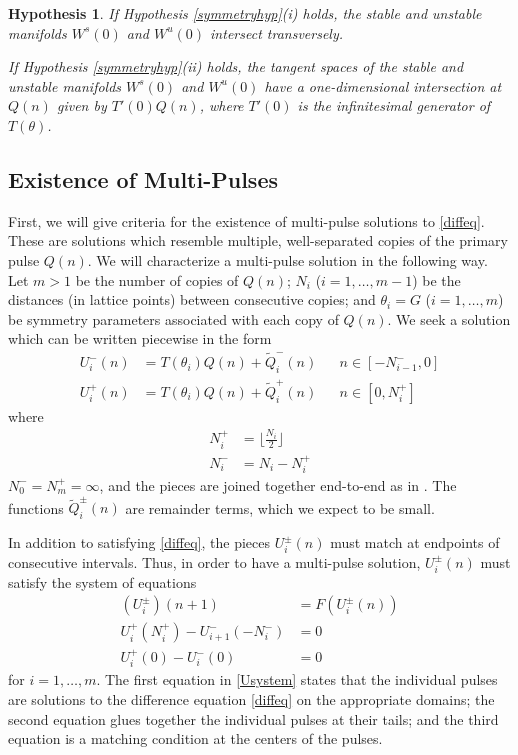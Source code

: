 \documentclass[12pt]{article}
\newtheorem{hypothesis}{Hypothesis}
\begin{document}
\begin{hypothesis}\label{intersectionhyp}
If Hypothesis \ref{symmetryhyp}(i) holds, the stable and unstable manifolds $W^s(0)$ and $W^u(0)$ intersect transversely.

If Hypothesis \ref{symmetryhyp}(ii) holds, the tangent spaces of the stable and unstable manifolds $W^s(0)$ and $W^u(0)$ have a one-dimensional intersection at $Q(n)$ given by $T'(0) Q(n)$, where $T'(0)$ is the infinitesimal generator of $T(\theta)$.
\end{hypothesis}

\subsection{Existence of Multi-Pulses}

First, we will give criteria for the existence of multi-pulse solutions to \eqref{diffeq}. These are solutions which resemble multiple, well-separated copies of the primary pulse $Q(n)$. We will characterize a multi-pulse solution in the following way. Let $m > 1$ be the number of copies of $Q(n)$; $N_i$ ($i = 1, \dots, m-1$) be the distances (in lattice points) between consecutive copies; and $\theta_i = G$ ($i = 1, \dots, m$) be symmetry parameters associated with each copy of $Q(n)$. We seek a solution which can be written piecewise in the form 
\begin{align}\label{Upiecewise}
U_i^-(n) &= T(\theta_i) Q(n) + \tilde{Q}_i^-(n) && n \in [-N_{i-1}^-, 0] \\
U_i^+(n) &= T(\theta_i) Q(n) + \tilde{Q}_i^+(n) && n \in [0, N_i^+]
\end{align}
where 
\begin{equation}\label{Nipm}
\begin{aligned}
N_i^+ &= \lfloor \frac{N_i}{2} \rfloor \\
N_i^- &= N_i - N_i^+
\end{aligned}
\end{equation}
$N_0^- = N_m^+ = \infty$, and the pieces are joined together end-to-end as in \cite{Sandstede1998}. The functions $\tilde{Q}_i^\pm(n)$ are remainder terms, which we expect to be small.

In addition to satisfying \eqref{diffeq}, the pieces $U_i^\pm(n)$ must match at endpoints of consecutive intervals. Thus, in order to have a multi-pulse solution, $U_i^\pm(n)$ must satisfy the system of equations
\begin{equation}\label{Usystem}
\begin{aligned}
(U_i^\pm)(n+1) &= F(U_i^\pm(n))  \\
U_i^+(N_i^+) - U_{i+1}^-(-N_i^-) &= 0 \\
U_i^+(0) - U_i^-(0) &= 0
\end{aligned}
\end{equation}
for $i = 1, \dots, m$. The first equation in \eqref{Usystem} states that the individual pulses are solutions to the difference equation \eqref{diffeq} on the appropriate domains; the second equation glues together the individual pulses at their tails; and the third equation is a matching condition at the centers of the pulses.
\end{document}
